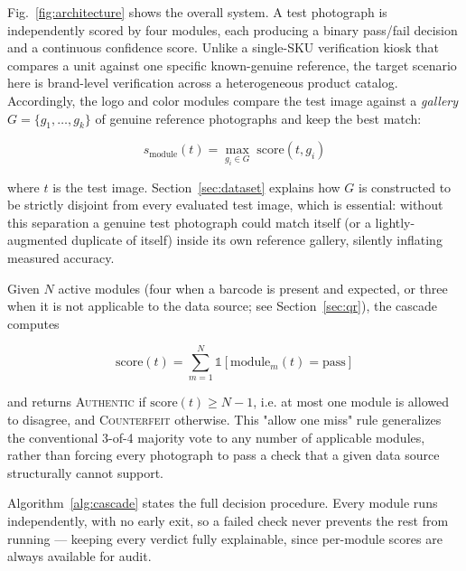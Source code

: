 \documentclass[conference]{IEEEtran}
\begin{document}
Fig.~\ref{fig:architecture} shows the overall system. A test photograph is
independently scored by four modules, each producing a binary pass/fail
decision and a continuous confidence score. Unlike a single-SKU
verification kiosk that compares a unit against one specific known-genuine
reference, the target scenario here is brand-level verification across a
heterogeneous product catalog. Accordingly, the logo and color modules
compare the test image against a \emph{gallery} $G = \{g_1, \dots, g_k\}$
of genuine reference photographs and keep the best match:

\begin{equation}
s_{\text{module}}(t) = \max_{g_i \in G} \; \text{score}(t, g_i)
\label{eq:gallery}
\end{equation}

where $t$ is the test image. Section~\ref{sec:dataset} explains how $G$ is
constructed to be strictly disjoint from every evaluated test image, which
is essential: without this separation a genuine test photograph could
match itself (or a lightly-augmented duplicate of itself) inside its own
reference gallery, silently inflating measured accuracy.

Given $N$ active modules (four when a barcode is present and expected, or
three when it is not applicable to the data source; see
Section~\ref{sec:qr}), the cascade computes

\begin{equation}
\text{score}(t) = \sum_{m=1}^{N} \mathbb{1}\left[\text{module}_m(t) = \text{pass}\right]
\end{equation}

and returns \textsc{Authentic} if $\text{score}(t) \geq N - 1$, i.e. at
most one module is allowed to disagree, and \textsc{Counterfeit}
otherwise. This "allow one miss" rule generalizes the conventional
3-of-4 majority vote to any number of applicable modules, rather than
forcing every photograph to pass a check that a given data source
structurally cannot support.

Algorithm~\ref{alg:cascade} states the full decision procedure. Every
module runs independently, with no early exit, so a failed check never
prevents the rest from running --- keeping every verdict fully
explainable, since per-module scores are always available for audit.
\end{document}
